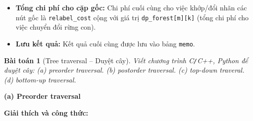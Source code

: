 \documentclass{article}
\newtheorem{baitoan}{Bài toán}
\begin{document}
\begin{itemize}
\begin{itemize}
\begin{itemize}
\begin{itemize}
\begin{enumerate}
                                \item Xóa cây con thứ $x$ của \texttt{node1} (chi phí 1 + \texttt{calculate\_distance\_recursive(T1, T2, child1\_id, -1)}).
                                \item Chèn cây con thứ $y$ của \texttt{node2} (chi phí 1 + \texttt{calculate\_distance\_recursive(T1, T2, -1, child2\_id)}).
                                \item Khớp/Đổi nhãn cây con thứ $x$ của \texttt{node1} với cây con thứ $y$ của \texttt{node2} (chi phí là tổng của \texttt{dp\_forest[x-1][y-1]} và kết quả đệ quy của \texttt{calculate\_distance\_recursive} cho hai cây con này).
                            \end{enumerate}
                    \end{itemize}
                \item \textbf{Tổng chi phí cho cặp gốc:} Chi phí cuối cùng cho việc khớp/đổi nhãn các nút gốc là \texttt{relabel\_cost} cộng với giá trị \texttt{dp\_forest[m][k]} (tổng chi phí cho việc chuyển đổi rừng con).
                \item \textbf{Lưu kết quả:} Kết quả cuối cùng được lưu vào bảng \texttt{memo}.
            \end{itemize}
    \end{itemize}
\end{itemize}


\begin{baitoan}[Tree traversal -- Duyệt cây]
    Viết chương trình {\sf C{\tt/}C++, Python} để duyệt cây: (a) preorder traversal. (b) postorder traversal. (c) top-down traveral. (d) bottom-up traversal.
\end{baitoan}

\textbf{(a) Preorder traversal}

\textbf{Giải thích và công thức:}
\end{document}

